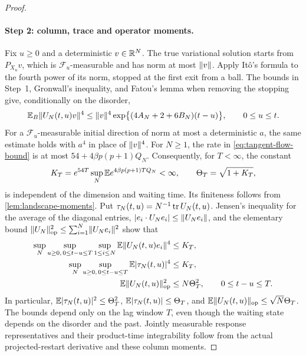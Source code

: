\begin{proof}
\paragraph{Step 2: column, trace and operator moments.}
Fix $u\ge0$ and a deterministic $v\in\mathbb R^N$. The true variational solution starts from $P_{X_u}v$, which is $\mathcal F_u$-measurable and has norm at most $\lVert v\rVert$. Apply It\^o's formula to the fourth power of its norm, stopped at the first exit from a ball. The bounds in Step~1, Gronwall's inequality, and Fatou's lemma when removing the stopping give, conditionally on the disorder,
\begin{equation}\label{eq:tangent-flow-bound}
 \mathbb E_B\lVert U_N(t,u)v\rVert^4
 \le\lVert v\rVert^4\exp\bigl\{(4A_N+2+6B_N)(t-u)\bigr\},
 \qquad 0\le u\le t.
\end{equation}
For a $\mathcal F_u$-measurable initial direction of norm at most a deterministic $a$, the same estimate holds with $a^4$ in place of $\lVert v\rVert^4$. For $N\ge1$, the rate in \eqref{eq:tangent-flow-bound} is at most $54+4\beta p(p+1)Q_N$. Consequently, for $T<\infty$, the constant
\[
 K_T=e^{54T}\sup_N\mathbb E e^{4\beta p(p+1)TQ_N}<\infty,
 \qquad \Theta_T=\sqrt{1+K_T},
\]
is independent of the dimension and waiting time. Its finiteness follows from \cref{lem:landscape-moments}. Put $\tau_N(t,u)=N^{-1}\operatorname{tr} U_N(t,u)$. Jensen's inequality for the average of the diagonal entries, $|e_i\cdot U_Ne_i|\le\lVert U_Ne_i\rVert$, and the elementary bound $\lVert U_N\rVert_{\mathrm{op}}^2\le\sum_{i=1}^N\lVert U_Ne_i\rVert^2$ show that
\begin{equation}\label{eq:finite-lag-flow-moments}
\begin{aligned}
 \sup_N\sup_{u\ge0,\,0\le t-u\le T}\sup_{1\le i\le N}
 \mathbb E\lVert U_N(t,u)e_i\rVert^4&\le K_T,\\
 \sup_N\sup_{u\ge0,\,0\le t-u\le T}
 \mathbb E|\tau_N(t,u)|^4&\le K_T,\\
 \mathbb E\lVert U_N(t,u)\rVert_{\mathrm{op}}^2&\le N\Theta_T^2,
 \qquad 0\le t-u\le T.
\end{aligned}
\end{equation}
In particular, $\mathbb E|\tau_N(t,u)|^2\le\Theta_T^2$, $\mathbb E|\tau_N(t,u)|\le\Theta_T$, and $\mathbb E\lVert U_N(t,u)\rVert_{\mathrm{op}}\le\sqrt N\Theta_T$. The bounds depend only on the lag window $T$, even though the waiting state depends on the disorder and the past. Jointly measurable response representatives and their product-time integrability follow from the actual projected-restart derivative and these column moments.


\end{proof}
